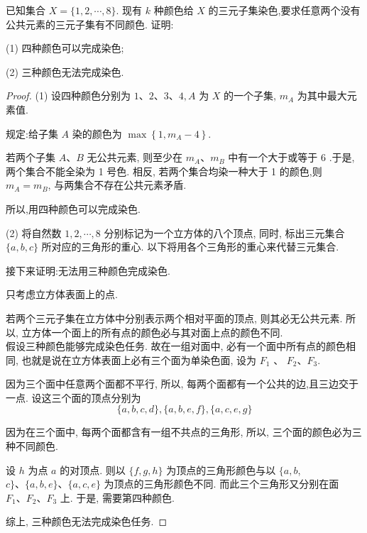 \begin{example}
	已知集合 $X=\{1,2, \cdots, 8\}$. 现有 $k$ 种颜色给 $X$ 的三元子集染色,要求任意两个没有公共元素的三元子集有不同颜色. 证明:

	(1) 四种颜色可以完成染色;

	(2) 三种颜色无法完成染色.
\end{example}
\begin{proof}
	(1) 设四种颜色分别为 $1 、 2 、 3 、 4, A$ 为 $X$ 的一个子集, $m_{A}$ 为其中最大元素值.

	规定:给子集 $A$ 染的颜色为 $\max \left\{1, m_{A}-4\right\}$.

	若两个子集 $A 、 B$ 无公共元素, 则至少在 $m_{A} 、 m_{B}$ 中有一个大于或等于 6 .于是, 两个集合不能全染为 1 号色. 相反, 若两个集合均染一种大于 1 的颜色,则 $m_{A}=m_{B}$, 与两集合不存在公共元素矛盾.

	所以,用四种颜色可以完成染色.

	(2) 将自然数 $1,2, \cdots, 8$ 分别标记为一个立方体的八个顶点, 同时, 标出三元集合 $\{a, b, c\}$ 所对应的三角形的重心. 以下将用各个三角形的重心来代替三元集合.

	接下来证明:无法用三种颜色完成染色.

	只考虑立方体表面上的点.

	若两个三元子集在立方体中分别表示两个相对平面的顶点, 则其必无公共元素. 所以, 立方体一个面上的所有点的颜色必与其对面上点的颜色不同.\\
	假设三种颜色能够完成染色任务. 故在一组对面中, 必有一个面中所有点的颜色相同, 也就是说在立方体表面上必有三个面为单染色面, 设为 $F_{1}$ 、 $F_{2} 、 F_{3}$.

	因为三个面中任意两个面都不平行, 所以, 每两个面都有一个公共的边,且三边交于一点. 设这三个面的顶点分别为
	$$
		\{a, b, c, d\},\{a, b, e, f\},\{a, c, e, g\}
	$$

	因为在三个面中, 每两个面都含有一组不共点的三角形, 所以, 三个面的颜色必为三种不同颜色.

	设 $h$ 为点 $a$ 的对顶点. 则以 $\{f, g, h\}$ 为顶点的三角形颜色与以 $\{a, b$, $c\} 、\{a, b, e\} 、\{a, c, e\}$ 为顶点的三角形颜色不同. 而此三个三角形又分别在面 $F_{1} 、 F_{2} 、 F_{3}$ 上. 于是, 需要第四种颜色.

	综上, 三种颜色无法完成染色任务.
\end{proof}


